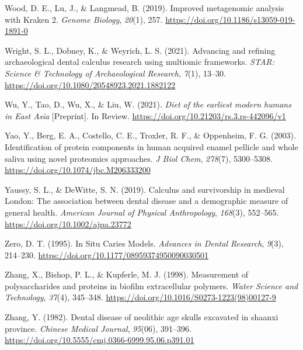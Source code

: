 \documentclass[
  letterpaper,
]{book}
\newlength{\cslhangindent}
\newlength{\cslentryspacingunit} %
\newenvironment{CSLReferences}[2] %
 {%
  \setlength{\parindent}{0pt}
  \ifodd #1
  \let\oldpar\par
  \def\par{\hangindent=\cslhangindent\oldpar}
  \fi
  \setlength{\parskip}{#2\cslentryspacingunit}
 }%
 {}
\begin{document}
\begin{CSLReferences}{1}{0}
\leavevmode{}%
Wood, D. E., Lu, J., \& Langmead, B. (2019). Improved metagenomic
analysis with {Kraken} 2. \emph{Genome Biology}, \emph{20}(1), 257.
\url{https://doi.org/10.1186/s13059-019-1891-0}

\leavevmode{}%
Wright, S. L., Dobney, K., \& Weyrich, L. S. (2021). Advancing and
refining archaeological dental calculus research using multiomic
frameworks. \emph{STAR: Science \& Technology of Archaeological
Research}, \emph{7}(1), 13--30.
\url{https://doi.org/10.1080/20548923.2021.1882122}

\leavevmode{}%
Wu, Y., Tao, D., Wu, X., \& Liu, W. (2021). \emph{Diet of the earliest
modern humans in {East Asia}} {[}Preprint{]}. {In Review}.
\url{https://doi.org/10.21203/rs.3.rs-442096/v1}

\leavevmode{}%
Yao, Y., Berg, E. A., Costello, C. E., Troxler, R. F., \& Oppenheim, F.
G. (2003). Identification of protein components in human acquired enamel
pellicle and whole saliva using novel proteomics approaches. \emph{J
Biol Chem}, \emph{278}(7), 5300--5308.
\url{https://doi.org/10.1074/jbc.M206333200}

\leavevmode{}%
Yaussy, S. L., \& DeWitte, S. N. (2019). Calculus and survivorship in
medieval {London}: {The} association between dental disease and a
demographic measure of general health. \emph{American Journal of
Physical Anthropology}, \emph{168}(3), 552--565.
\url{https://doi.org/10.1002/ajpa.23772}

\leavevmode{}%
Zero, D. T. (1995). In {Situ Caries Models}. \emph{Advances in Dental
Research}, \emph{9}(3), 214--230.
\url{https://doi.org/10.1177/08959374950090030501}

\leavevmode{}%
Zhang, X., Bishop, P. L., \& Kupferle, M. J. (1998). Measurement of
polysaccharides and proteins in biofilm extracellular polymers.
\emph{Water Science and Technology}, \emph{37}(4), 345--348.
\url{https://doi.org/10.1016/S0273-1223(98)00127-9}

\leavevmode{}%
Zhang, Y. (1982). Dental disease of neolithic age skulls excavated in
shaanxi province. \emph{Chinese Medical Journal}, \emph{95}(06),
391--396. \url{https://doi.org/10.5555/cmj.0366-6999.95.06.p391.01}


\end{CSLReferences}
\end{document}
